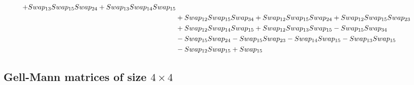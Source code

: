 \documentclass[10pt,a4paper]{amsart}
\begin{document}
\begin{align*}
        + \textnormal{Swap}_{13} \textnormal{Swap}_{15} \textnormal{Swap}_{24} + \textnormal{Swap}_{13} \textnormal{Swap}_{14} \textnormal{Swap}_{15}\\ & + \textnormal{Swap}_{12} \textnormal{Swap}_{15} \textnormal{Swap}_{34} + \textnormal{Swap}_{12} \textnormal{Swap}_{15} \textnormal{Swap}_{24} + \textnormal{Swap}_{12} \textnormal{Swap}_{15} \textnormal{Swap}_{23}\\ & +
        \textnormal{Swap}_{12} \textnormal{Swap}_{14} \textnormal{Swap}_{15} + \textnormal{Swap}_{12} \textnormal{Swap}_{13} \textnormal{Swap}_{15} - \textnormal{Swap}_{15} \textnormal{Swap}_{34}\\ & - \textnormal{Swap}_{15} \textnormal{Swap}_{24} - \textnormal{Swap}_{15} \textnormal{Swap}_{23} - \textnormal{Swap}_{14} \textnormal{Swap}_{15} -
        \textnormal{Swap}_{13} \textnormal{Swap}_{15}\\ & - \textnormal{Swap}_{12} \textnormal{Swap}_{15} + \textnormal{Swap}_{15}\\
\end{align*}



\subsection{Gell-Mann matrices of size $4 \times 4$}\label{subsec: gm4}
\end{document}
